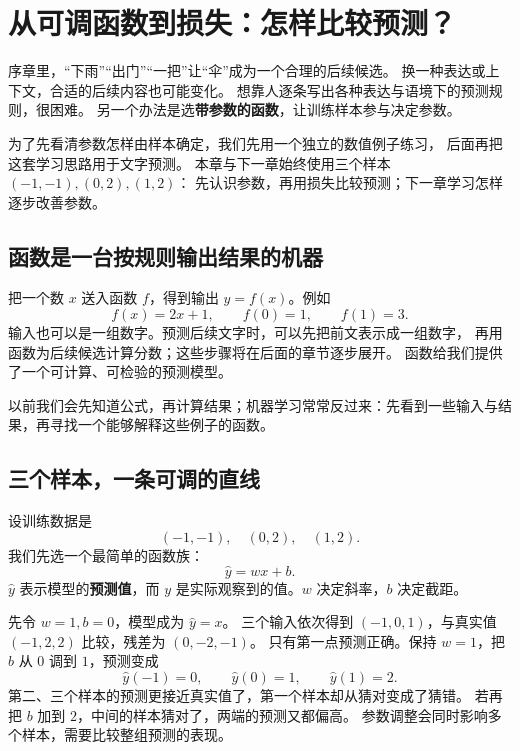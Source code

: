 \chapterrule
\section{从可调函数到损失：怎样比较预测？}
\label{intro:00-functions}
\label{intro:16-loss-gradient}

序章里，“下雨”“出门”“一把”让“伞”成为一个合理的后续候选。
换一种表达或上下文，合适的后续内容也可能变化。
想靠人逐条写出各种表达与语境下的预测规则，很困难。
另一个办法是选\textbf{带参数的函数}，让训练样本参与决定参数。

为了先看清参数怎样由样本确定，我们先用一个独立的数值例子练习，
后面再把这套学习思路用于文字预测。
本章与下一章始终使用三个样本 $(-1,-1),(0,2),(1,2)$：
先认识参数，再用损失比较预测；下一章学习怎样逐步改善参数。


\subsection{函数是一台按规则输出结果的机器}
\label{concept:function}

把一个数 $x$ 送入函数 $f$，得到输出 $y=f(x)$。例如
\[
f(x)=2x+1,\qquad f(0)=1,\qquad f(1)=3.
\]
输入也可以是一组数字。预测后续文字时，可以先把前文表示成一组数字，
再用函数为后续候选计算分数；这些步骤将在后面的章节逐步展开。
函数给我们提供了一个可计算、可检验的预测模型。

以前我们会先知道公式，再计算结果；机器学习常常反过来：先看到一些输入与结果，再寻找一个能够解释这些例子的函数。

\subsection{三个样本，一条可调的直线}
\label{concept:sample}

设训练数据是
\[
(-1,-1),\quad(0,2),\quad(1,2).
\]
我们先选一个最简单的函数族：
\begin{equation}
\widehat{y}=wx+b.
\label{eq:line-first}
\end{equation}
$\widehat{y}$ 表示模型的\textbf{预测值}，而 $y$ 是实际观察到的值。$w$ 决定斜率，$b$ 决定截距。

先令 $w=1,b=0$，模型成为 $\widehat{y}=x$。
三个输入依次得到 $(-1,0,1)$，与真实值 $(-1,2,2)$ 比较，残差为 $(0,-2,-1)$。
只有第一点预测正确。保持 $w=1$，把 $b$ 从 $0$ 调到 $1$，预测变成
\[
\widehat{y}(-1)=0,\qquad \widehat{y}(0)=1,\qquad \widehat{y}(1)=2.
\]
第二、三个样本的预测更接近真实值了，第一个样本却从猜对变成了猜错。
若再把 $b$ 加到 $2$，中间的样本猜对了，两端的预测又都偏高。
参数调整会同时影响多个样本，需要比较整组预测的表现。

